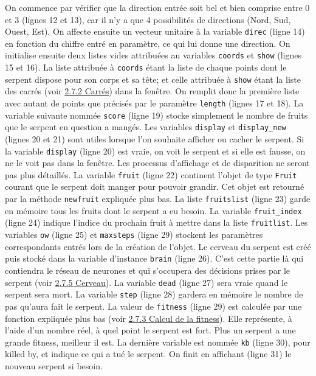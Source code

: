 \documentclass[12pt, a4paper, openany]{book}
\begin{document}
On commence par vérifier que la direction entrée soit bel et bien comprise entre 0 et 3 (lignes 12 et 13), car il n'y a que 4 possibilités de directions (Nord, Sud, Ouest, Est). On affecte ensuite un vecteur unitaire à la variable \verb'direc' (ligne 14) en fonction du chiffre entré en paramètre, ce qui lui donne une direction. On initialise ensuite deux listes vides attribuées au variables \verb'coords' et \verb'show' (lignes 15 et 16). La liste attribuée à \verb'coords' étant la liste de chaque points dont le serpent dispose pour son corps et sa tête; et celle attribuée à \verb'show' étant la liste des carrés (voir \hyperref[r:2.7.2-car]{2.7.2 Carrés}) dans la fenêtre. On remplit donc la première liste avec autant de points que précisés par le paramètre \verb'length' (lignes 17 et 18). La variable suivante nommée \verb'score' (ligne 19) stocke simplement le nombre de fruits que le serpent en question a mangés. Les variables \verb'display' et \verb'display_new' (lignes 20 et 21) sont utiles lorsque l'on souhaite afficher ou cacher le serpent. Si la variable \verb'display' (ligne 20) est \og{}vraie\fg{}, on voit le serpent et si elle est \og{}fausse\fg{}, on ne le voit pas dans la fenêtre. Les processus d'affichage et de disparition ne seront pas plus détaillés. La variable \verb'fruit' (ligne 22) continent l'objet de type \verb'Fruit' courant que le serpent doit manger pour pouvoir grandir. Cet objet est retourné par la méthode \verb'newfruit' expliquée plus bas. La liste \verb'fruitslist' (ligne 23) garde en mémoire tous les fruits dont le serpent a eu besoin. La variable \verb'fruit_index' (ligne 24) indique l'indice du prochain fruit à mettre dans la liste \verb'fruitlist'. Les variables \verb'ow' (ligne 25) et \verb'maxsteps' (ligne 29) stockent les paramètres correspondants entrés lors de la création de l'objet. Le \og{}cerveau\fg{} du serpent est créé puis stocké dans la variable d'instance \verb'brain' (ligne 26). C'est cette partie là qui contiendra le réseau de neurones et qui s'occupera des décisions prises par le serpent (voir \hyperref[r:2.7.5]{2.7.5 Cerveau}). La variable \verb'dead' (ligne 27) sera \og{}vraie\fg{} quand le serpent sera mort. La variable \verb'step' (ligne 28) gardera en mémoire le nombre de \og{}pas\fg{} qu'aura fait le serpent. La valeur de \verb'fitness' (ligne 29) est calculée par une fonction expliquée plus bas (voir \hyperref[r:2.7.3-fit]{2.7.3 Calcul de la fitness}). Elle représente, à l'aide d'un nombre réel, à quel point le serpent est fort. Plus un serpent a une grande fitness, meilleur il est. La dernière variable est nommée \verb'kb' (ligne 30), pour \og{}killed by\fg{}, et indique ce qui a tué le serpent. On finit en affichant (ligne 31) le nouveau serpent si besoin.
\end{document}

